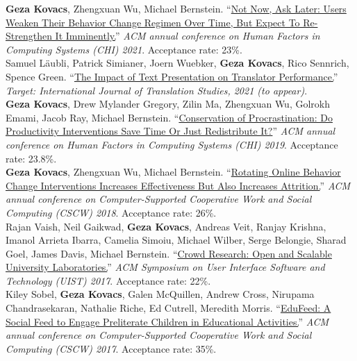 
\textbf{Geza Kovacs}, {\small Zhengxuan Wu, Michael Bernstein.} ``\href{https://hci.stanford.edu/publications/2021/notnow/notnowasklater.pdf}{Not Now, Ask Later: Users Weaken Their Behavior Change Regimen Over Time, But Expect To Re-Strengthen It Imminently.}'' \emph{ACM annual conference on Human Factors in Computing Systems (CHI) 2021}. Acceptance rate: 23\%.\\ %

{\small Samuel Läubli, Patrick Simianer, Joern Wuebker,} \textbf{Geza Kovacs}, {\small Rico Sennrich, Spence Green.} ``\href{https://arxiv.org/pdf/2011.05978.pdf}{The Impact of Text Presentation on Translator Performance.}'' \emph{Target: International Journal of Translation Studies, 2021 (to appear)}.\\

\textbf{Geza Kovacs}, {\small Drew Mylander Gregory, Zilin Ma, Zhengxuan Wu, Golrokh Emami, Jacob Ray, Michael Bernstein.} ``\href{https://hci.stanford.edu/publications/2019/conservation/conservation-chi2019.pdf}{Conservation of Procrastination: Do Productivity Interventions Save Time Or Just Redistribute It?}'' \emph{ACM annual conference on Human Factors in Computing Systems (CHI) 2019}. Acceptance rate: 23.8\%.\\ %


\textbf{Geza Kovacs}, {\small Zhengxuan Wu, Michael Bernstein.} ``\href{https://hci.stanford.edu/publications/2018/habitlab/habitlab-cscw18.pdf}{Rotating Online Behavior Change Interventions Increases Effectiveness But Also Increases Attrition.}'' \emph{ACM annual conference on Computer-Supported Cooperative Work and Social Computing (CSCW) 2018}. Acceptance rate: 26\%.\\

{\small Rajan Vaish, Neil Gaikwad,} \textbf{Geza Kovacs}, {\small Andreas Veit, Ranjay Krishna, Imanol Arrieta Ibarra, Camelia Simoiu, Michael Wilber, Serge Belongie, Sharad Goel, James Davis, Michael Bernstein.} ``\href{https://hci.stanford.edu/publications/2017/crowdresearch/crowd-research-uist2017.pdf}{Crowd Research: Open and Scalable University Laboratories.}'' \emph{ACM Symposium on User Interface Software and Technology (UIST) 2017}. Acceptance rate: 22\%.\\

{\small Kiley Sobel,} \textbf{Geza Kovacs}, {\small Galen McQuillen, Andrew Cross, Nirupama Chandrasekaran, Nathalie Riche, Ed Cutrell, Meredith Morris.} ``\href{https://www.microsoft.com/en-us/research/wp-content/uploads/2016/10/edufeed.pdf}{EduFeed: A Social Feed to Engage Preliterate Children in Educational Activities.}'' \emph{ACM annual conference on Computer-Supported Cooperative Work and Social Computing (CSCW) 2017}. Acceptance rate: 35\%.\\

